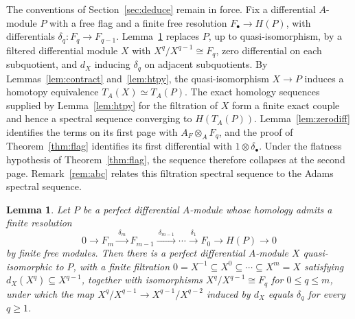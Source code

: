 \documentclass[11pt,reqno]{amsart}
\theoremstyle{plain}
\newtheorem{lemma}[theorem]{Lemma}
\theoremstyle{definition}
\newcommand{\Tate}{T}                 %
\begin{document}
The conventions of Section~\ref{sec:deduce} remain in force.  Fix a differential $A$-module $P$
with a free flag and a finite free resolution $F_\bullet\to H(P)$, with differentials
$\delta_q\colon F_q\to F_{q-1}$.  Lemma~\ref{lem:filtration} replaces $P$, up to
quasi-isomorphism, by a filtered differential module $X$ with $X^q/X^{q-1}\cong F_q$, zero
differential on each subquotient, and $d_X$ inducing $\delta_q$ on adjacent subquotients.  By
Lemmas~\ref{lem:contract} and~\ref{lem:htpy}, the
quasi-isomorphism $X\to P$ induces a homotopy equivalence
$\Tate_A(X)\simeq\Tate_A(P)$.  The exact homology sequences supplied by
Lemma~\ref{lem:htpy} for the filtration of $X$ form a finite exact couple and hence a spectral
sequence converging to $H(\Tate_A(P))$.
Lemma~\ref{lem:zerodiff} identifies the terms on its first page with $A_F\otimes_AF_q$, and the proof of
Theorem~\ref{thm:flag} identifies its first differential with $1\otimes\delta_\bullet$.  Under the
flatness hypothesis of Theorem~\ref{thm:flag}, the sequence therefore collapses at the second page.
Remark~\ref{rem:abc} relates this
filtration spectral sequence to the Adams spectral sequence.

\begin{lemma}\label{lem:filtration}
Let $P$ be a perfect differential $A$-module whose homology admits a finite resolution
\[
0\to F_m\xrightarrow{\ \delta_m\ }F_{m-1}\xrightarrow{\ \delta_{m-1}\ }\cdots
\xrightarrow{\ \delta_1\ }F_0\to H(P)\to0
\]
by finite free modules.  Then there is a perfect differential $A$-module $X$ quasi-isomorphic to
$P$, with a finite filtration $0=X^{-1}\subseteq X^{0}\subseteq\cdots\subseteq X^{m}=X$ satisfying
$d_X(X^{q})\subseteq X^{q-1}$, together with isomorphisms $X^{q}/X^{q-1}\cong F_q$ for
$0\le q\le m$, under which the map $X^{q}/X^{q-1}\to X^{q-1}/X^{q-2}$ induced by $d_X$ equals
$\delta_q$ for every $q\ge1$.
\end{lemma}
\end{document}
